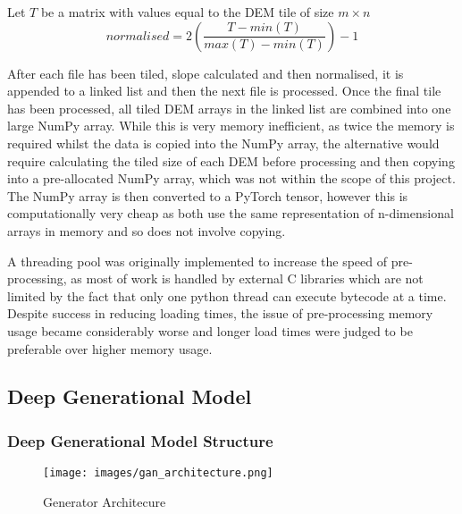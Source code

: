 \documentclass[twocolumn]{article}
\begin{document}
Let \(T\) be a matrix with values equal to the DEM tile of size \(m \times n\)
\begin{equation}\label{eq:normalise}
normalised = 2\left(\frac{T - min(T)}{max(T) - min(T)}\right) - 1
\end{equation}

After each file has been tiled, slope calculated and then normalised, it is appended to a linked list and then the next file is processed.
Once the final tile has been processed, all tiled DEM arrays in the linked list are combined into one large NumPy array.
While this is very memory inefficient, as twice the memory is required whilst the data is copied into the NumPy array, the alternative would require calculating the tiled size of each DEM before processing and then copying into a pre-allocated NumPy array, which was not within the scope of this project.
The NumPy array is then converted to a PyTorch tensor, however this is computationally very cheap as both use the same representation of n-dimensional arrays in memory and so does not involve copying.

A threading pool was originally implemented to increase the speed of pre-processing, as most of work is handled by external C libraries which are not limited by the fact that only one python thread can execute bytecode at a time.
Despite success in reducing loading times, the issue of pre-processing memory usage became considerably worse and longer load times were judged to be preferable over higher memory usage.

\subsection{Deep Generational Model}
\label{sec:orgfb49bda}
\subsubsection{Deep Generational Model Structure}
\label{sec:orgb45f42e}

\begin{figure*}
\centering
\texttt{[image: images/gan\_architecture.png]}
\caption{\label{fig:generator}Generator Architecure}
\end{figure*}
\end{document}
